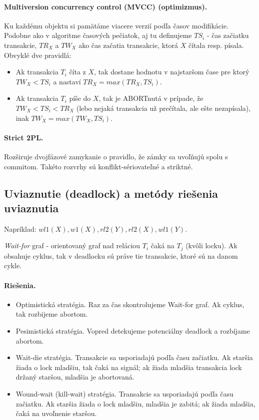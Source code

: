 \documentclass[10pt,a4paper]{article}
\begin{document}
\paragraph{Multiversion concurrency control (MVCC) (optimizmus).}
Ku každému objektu si pamätáme viacere verzií podľa časov modifikácie.
Podobne ako v algoritme časových pečiatok, aj tu definujeme $TS_i$ - čas začiatku transakcie, $TR_X$ a $TW_X$ ako čas začatia transakcie, ktorá $X$ čítala resp. písala. Obvyklé dve pravidlá:

\begin{itemize}
\item Ak transakcia $T_i$ číta z $X$, tak dostane hodnotu v najstaršom čase pre ktorý $TW_X < TS_i$ a nastaví $TR_X = max(TR_X, TS_i)$.
\item Ak transakcia $T_i$ píše do $X$, tak je ABORTnutá v prípade, že $TW_X < TS_i < TR_X$ (lebo nejaká transakcia už prečítala, ale ešte nezapísala), inak $TW_X = max(TW_X, TS_i)$.
\end{itemize}

\paragraph{Strict 2PL.}
Rozširuje dvojfázové zamykanie o pravidlo, že zámky sa uvoľňujú spolu s commitom. Takéto rozvrhy sú konflikt-sériovateľné a striktné.


\subsection{Uviaznutie (deadlock) a metódy riešenia uviaznutia}
Napríklad: $wl1(X), w1(X), rl2(Y), rl2(X), wl1(Y)$.

\emph{Wait-for} graf - orientovaný graf nad reláciou $T_i$ čaká na $T_j$ (kvôli locku).
Ak obsahuje cyklus, tak v deadlocku sú práve tie transakcie, ktoré sú na danom cykle.

\paragraph{Riešenia.}

\begin{itemize}
\item Optimistická stratégia. Raz za čas skontrolujeme Wait-for graf. Ak cyklus, tak rozbijeme abortom.
\item Pesimistická stratégia. Vopred detekujeme potenciálny deadlock a rozbíjame abortom.
\item Wait-die stratégia. Transakcie sa usporiadajú podľa času začiatku.
      Ak staršia žiada o lock mladšiu, tak čaká na signál; ak žiada
      mladšia transakcia lock držaný staršou, mladšia je abortovaná.
\item Wound-wait (kill-wait) stratégia. Transakcie sa usporiadajú podľa
      času začiatku. Ak staršia žiada o lock mladšiu, mladšia je
      zabitá; ak žiada mladšia, čaká na uvoľnenie staršou.
\end{itemize}
\end{document}
